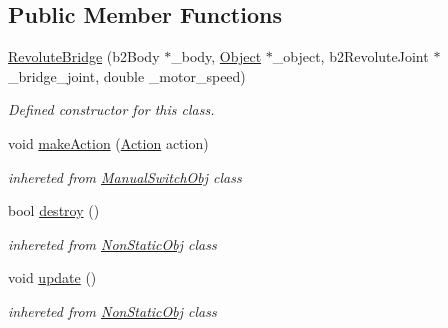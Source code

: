 \subsection*{Public Member Functions}
\begin{DoxyCompactItemize}
\item 
\hyperlink{class_revolute_bridge_a2b0f68222d155f93018b85bd5629c4b4}{Revolute\+Bridge} (b2\+Body $\ast$\+\_\+body, \hyperlink{class_object}{Object} $\ast$\+\_\+object, b2\+Revolute\+Joint $\ast$\+\_\+bridge\+\_\+joint, double \+\_\+motor\+\_\+speed)
\begin{DoxyCompactList}\small\item\em Defined constructor for this class. \end{DoxyCompactList}\item 
\mbox{\label{class_revolute_bridge_aad7a57a94ab4bd41cd4e1da48d627d00}} 
void \hyperlink{class_revolute_bridge_aad7a57a94ab4bd41cd4e1da48d627d00}{make\+Action} (\hyperlink{_manual_switch_obj_8h_a8bb1ef53467e4f61410d12822d922498}{Action} action)
\begin{DoxyCompactList}\small\item\em inhereted from \hyperlink{class_manual_switch_obj}{Manual\+Switch\+Obj} class \end{DoxyCompactList}\item 
\mbox{\label{class_revolute_bridge_ae3777840011c40e126e6e3fce4706f9a}} 
bool \hyperlink{class_revolute_bridge_ae3777840011c40e126e6e3fce4706f9a}{destroy} ()
\begin{DoxyCompactList}\small\item\em inhereted from \hyperlink{class_non_static_obj}{Non\+Static\+Obj} class \end{DoxyCompactList}\item 
\mbox{\label{class_revolute_bridge_ac462a7308f806d30c53e35b2b8a57e5d}} 
void \hyperlink{class_revolute_bridge_ac462a7308f806d30c53e35b2b8a57e5d}{update} ()
\begin{DoxyCompactList}\small\item\em inhereted from \hyperlink{class_non_static_obj}{Non\+Static\+Obj} class \end{DoxyCompactList}\end{DoxyCompactItemize}
